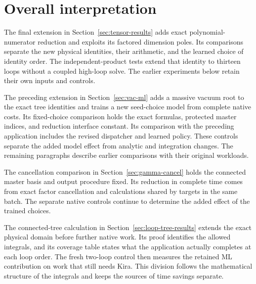 \documentclass[11pt,a4paper]{article}
\begin{document}

























\section{Overall interpretation}
\label{sec:overall-new}
The final extension in Section~\ref{sec:tensor-results} adds exact polynomial-numerator reduction and exploits its factored dimension poles. Its comparisons separate the new physical identities, their arithmetic, and the learned choice of identity order. The independent-product tests extend that identity to thirteen loops without a coupled high-loop solve. The earlier experiments below retain their own inputs and controls.

The preceding extension in Section~\ref{sec:vac-ml} adds a massive vacuum root to the exact tree identities and trains a new seed-choice model from complete native costs. Its fixed-choice comparison holds the exact formulas, protected master indices, and reduction interface constant. Its comparison with the preceding application includes the revised dispatcher and learned policy. These controls separate the added model effect from analytic and integration changes. The remaining paragraphs describe earlier comparisons with their original workloads.

The cancellation comparison in Section~\ref{sec:gamma-cancel} holds the connected master basis and output procedure fixed. Its reduction in complete time comes from exact factor cancellation and calculations shared by targets in the same batch. The separate native controls continue to determine the added effect of the trained choices.

The connected-tree calculation in Section~\ref{sec:loop-tree-results} extends the exact physical domain before further native work. Its proof identifies the allowed integrals, and its coverage table states what the application actually completes at each loop order. The fresh two-loop control then measures the retained ML contribution on work that still needs Kira. This division follows the mathematical structure of the integrals and keeps the sources of time savings separate.
\end{document}

